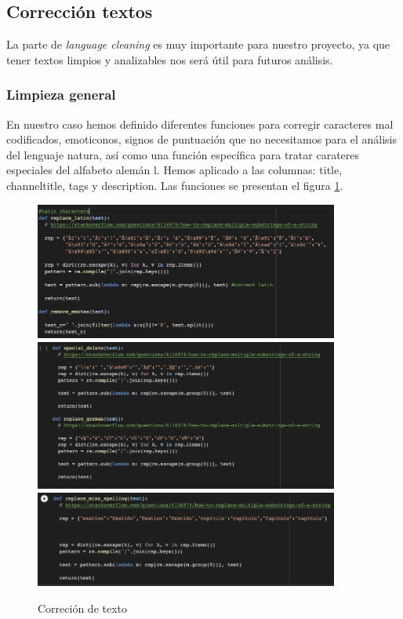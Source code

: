 \documentclass[a4paper,12pt]{article}
\begin{document}
\subsection{Correcci\'on  textos}
La parte de {\itshape language cleaning} es muy importante para nuestro proyecto, ya que tener textos limpios y analizables nos ser\'a \'util para futuros   an\'alisis.


\subsubsection{Limpieza general}

En nuestro caso hemos definido diferentes funciones para corregir caracteres mal codificados, emoticonos, signos de puntuaci\'on que no necesitamos para el an\'alisis del lenguaje natura, as\'i como una funci\'on espec\'ifica para tratar carateres especiales del alfabeto alem\'an l. Hemos aplicado a las columnas: title, channel{\textunderscore}title,  tags y description. Las funciones se presentan el figura \ref{fig:corrtext}.



\begin{figure}[h!]
\centering
\includegraphics[width=10cm]{latin_characters.png}\\
\includegraphics[width=10cm]{german_characters.png}\\
\includegraphics[width=10cm]{misspellings.png}
\caption{Correci\'on de texto}
\label{fig:corrtext}
\end{figure}
\end{document}
